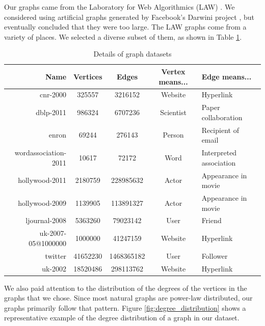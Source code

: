 Our graphs came from the Laboratory for Web Algorithmics (LAW)
\cite{BoVWFI, BRSLLP}. We considered using artificial graphs generated by 
Facebook's Darwini project \cite{edunov_darwini:_2016}, but eventually 
concluded that they were too large. The LAW graphs come 
from a variety of places. We selected a diverse subset of them, as shown in 
Table \ref{tab:graph_types}.

\begin{table}[t]
	\centering
	\begin{tabular}{r|cccl}
		\textbf{Name} & \textbf{Vertices} & \textbf{Edges} & \textbf{Vertex 
		means...} & \textbf{Edge means...}\\
		\hline
		cnr-2000 & 325557 & 3216152 & Website & Hyperlink\\
		dblp-2011 & 986324 & 6707236 & Scientist & Paper collaboration \\
		enron & 69244 & 276143 & Person & Recipient of email\\
		wordassociation-2011 & 10617 & 72172 & Word & Interpreted association \\
		hollywood-2011 & 2180759 & 228985632 & Actor & Appearance in movie\\
		hollywood-2009 & 1139905 & 113891327 & Actor & Appearance in movie\\
		ljournal-2008 & 5363260 & 79023142 & User & Friend\\
		uk-2007-05@1000000 & 1000000 & 41247159 & Website & Hyperlink\\
		twitter & 41652230 & 1468365182 & User & Follower\\
		uk-2002 & 18520486 & 298113762 & Website & Hyperlink\\
	\end{tabular}
	\caption{Details of graph datasets}
	\label{tab:graph_types}
\end{table}

We also paid attention to the distribution of the degrees of the vertices in 
the graphs that we chose. Since most natural graphs are power-law distributed, 
our graphs primarily follow that pattern. Figure \ref{fig:degree_distribution} 
shows a representative example of the degree distribution of a graph in our 
dataset. 


